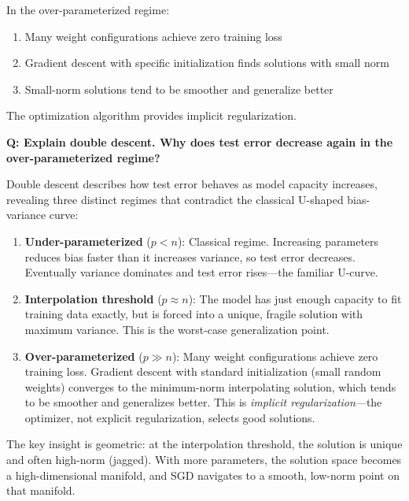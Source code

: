 \begin{keyinsight}
In the over-parameterized regime:
\begin{enumerate}
    \item Many weight configurations achieve zero training loss
    \item Gradient descent with specific initialization finds solutions with small norm
    \item Small-norm solutions tend to be smoother and generalize better
\end{enumerate}
The optimization algorithm provides implicit regularization.
\end{keyinsight}

\begin{interviewq}
\textbf{Q: Explain double descent. Why does test error decrease again in the over-parameterized regime?}

 \quad {} \quad \badgefreq{\freqhigh}

\stronganswer
Double descent describes how test error behaves as model capacity increases, revealing three distinct regimes that contradict the classical U-shaped bias-variance curve:

\begin{enumerate}
    \item \textbf{Under-parameterized} ($p < n$): Classical regime. Increasing parameters reduces bias faster than it increases variance, so test error decreases. Eventually variance dominates and test error rises---the familiar U-curve.
    \item \textbf{Interpolation threshold} ($p \approx n$): The model has just enough capacity to fit training data exactly, but is forced into a unique, fragile solution with maximum variance. This is the worst-case generalization point.
    \item \textbf{Over-parameterized} ($p \gg n$): Many weight configurations achieve zero training loss. Gradient descent with standard initialization (small random weights) converges to the minimum-norm interpolating solution, which tends to be smoother and generalizes better. This is \textit{implicit regularization}---the optimizer, not explicit regularization, selects good solutions.
\end{enumerate}

The key insight is geometric: at the interpolation threshold, the solution is unique and often high-norm (jagged). With more parameters, the solution space becomes a high-dimensional manifold, and SGD navigates to a smooth, low-norm point on that manifold.


\end{interviewq}
